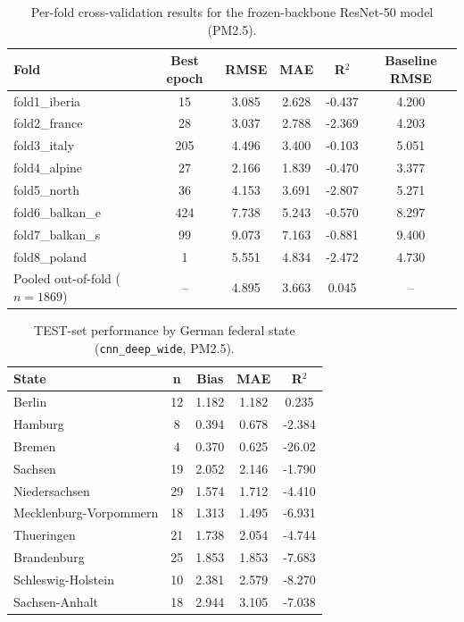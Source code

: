 \documentclass[english, a4paper]{article}
\begin{document}
\begin{table}[ht]
\centering
\caption{Per-fold cross-validation results for the frozen-backbone ResNet-50 model (PM2.5).}
\label{tab:resnet_frozen_folds}
\begin{tabular}{lccccc}
\hline
\textbf{Fold} & \textbf{Best epoch} & \textbf{RMSE} & \textbf{MAE} & \textbf{R}$^2$ & \textbf{Baseline RMSE} \\
\hline
fold1\_iberia    & 15  & 3.085 & 2.628 & -0.437 & 4.200 \\
fold2\_france    & 28  & 3.037 & 2.788 & -2.369 & 4.203 \\
fold3\_italy     & 205 & 4.496 & 3.400 & -0.103 & 5.051 \\
fold4\_alpine    & 27  & 2.166 & 1.839 & -0.470 & 3.377 \\
fold5\_north     & 36  & 4.153 & 3.691 & -2.807 & 5.271 \\
fold6\_balkan\_e & 424 & 7.738 & 5.243 & -0.570 & 8.297 \\
fold7\_balkan\_s & 99  & 9.073 & 7.163 & -0.881 & 9.400 \\
fold8\_poland    & 1   & 5.551 & 4.834 & -2.472 & 4.730 \\
\hline
Pooled out-of-fold ($n=1869$) & -- & 4.895 & 3.663 & 0.045 & -- \\
\hline
\end{tabular}
\end{table}

\begin{table}[ht]
\centering
\caption{TEST-set performance by German federal state (\texttt{cnn\_deep\_wide}, PM2.5).}
\label{tab:test_by_state}
\begin{tabular}{lcccc}
\hline
\textbf{State} & \textbf{n} & \textbf{Bias} & \textbf{MAE} & \textbf{R}$^2$ \\
\hline
Berlin                  & 12 & 1.182 & 1.182 & 0.235 \\
Hamburg                 & 8  & 0.394 & 0.678 & -2.384 \\
Bremen                  & 4  & 0.370 & 0.625 & -26.02 \\
Sachsen                 & 19 & 2.052 & 2.146 & -1.790 \\
Niedersachsen           & 29 & 1.574 & 1.712 & -4.410 \\
Mecklenburg-Vorpommern  & 18 & 1.313 & 1.495 & -6.931 \\
Thueringen              & 21 & 1.738 & 2.054 & -4.744 \\
Brandenburg             & 25 & 1.853 & 1.853 & -7.683 \\
Schleswig-Holstein      & 10 & 2.381 & 2.579 & -8.270 \\
Sachsen-Anhalt          & 18 & 2.944 & 3.105 & -7.038 \\
\hline
\end{tabular}
\end{table}
\end{document}
